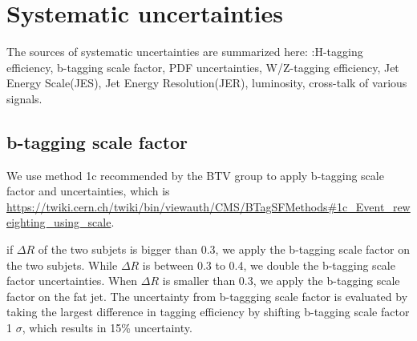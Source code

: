 
\section{Systematic uncertainties }
\label{sec:systematics}

The sources of systematic uncertainties are summarized here:  
:H-tagging efficiency, b-tagging scale factor, PDF uncertainties, 
W/Z-tagging efficiency, Jet Energy Scale(JES), Jet Energy Resolution(JER), luminosity, cross-talk of various signals.




\subsection{b-tagging scale factor}
We use method 1c recommended by the BTV group to apply b-tagging scale factor and uncertainties, 
which is \url{https://twiki.cern.ch/twiki/bin/viewauth/CMS/BTagSFMethods\#1c\_Event\_reweighting\_using\_scale}. 

if $\Delta R$ of the two subjets is bigger 
than 0.3, we apply the b-tagging scale factor
on the two subjets. While $\Delta R$ is between 0.3 to 0.4,  
we double the b-tagging scale factor uncertainties.
When $\Delta R$ is smaller than 0.3, we apply the 
b-tagging scale factor on the fat jet.
The uncertainty from b-taggging scale factor is evaluated by taking the largest difference 
in tagging efficiency by shifting
 b-tagging scale factor 1 $\sigma$, which results in 15\% uncertainty. 

